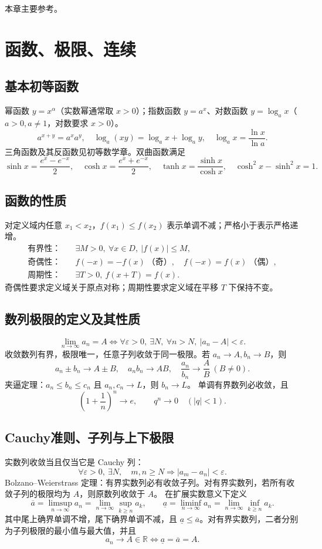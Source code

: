 \documentclass[../main.tex]{subfiles}
\begin{document}
本章主要参考\cite{dlmf,hunter}。

\section{函数、极限、连续}
\subsection{基本初等函数}
幂函数 $y=x^\alpha$（实数幂通常取 $x>0$）；指数函数 $y=a^x$、对数函数 $y=\log_a x$（$a>0,a\ne1$，对数要求 $x>0$）。
\[
a^{x+y}=a^xa^y,\quad \log_a(xy)=\log_a x+\log_a y,\quad
\log_a x=\frac{\ln x}{\ln a}.
\]
三角函数及其反函数见初等数学章。双曲函数满足
\[
\sinh x=\frac{e^x-e^{-x}}2,\quad \cosh x=\frac{e^x+e^{-x}}2,\quad
\tanh x=\frac{\sinh x}{\cosh x},\quad \cosh^2x-\sinh^2x=1.
\]
\subsection{函数的性质}
对定义域内任意 $x_1<x_2$，$f(x_1)\le f(x_2)$ 表示单调不减；严格小于表示严格递增。
\begin{align*}
\text{有界性：}&\quad \exists M>0,\ \forall x\in D,\ |f(x)|\le M,\\
\text{奇偶性：}&\quad f(-x)=-f(x)\ \text{（奇）},\quad f(-x)=f(x)\ \text{（偶）},\\
\text{周期性：}&\quad \exists T>0,\ f(x+T)=f(x).
\end{align*}
奇偶性要求定义域关于原点对称；周期性要求定义域在平移 $T$ 下保持不变。
\subsection{数列极限的定义及其性质}
\[
\lim_{n\to\infty}a_n=A\iff
\forall\varepsilon>0,\ \exists N,\ \forall n>N,\ |a_n-A|<\varepsilon.
\]
收敛数列有界，极限唯一，任意子列收敛于同一极限。若 $a_n\to A,b_n\to B$，则
\[
a_n\pm b_n\to A\pm B,\quad a_nb_n\to AB,\quad
\frac{a_n}{b_n}\to\frac AB\ (B\ne0).
\]
夹逼定理：$a_n\le b_n\le c_n$ 且 $a_n,c_n\to L$，则 $b_n\to L$。
单调有界数列必收敛，且
\[
\left(1+\frac1n\right)^n\to e,\qquad q^n\to0\quad(|q|<1).
\]
\subsection{Cauchy准则、子列与上下极限}
实数列收敛当且仅当它是 Cauchy 列：
\[
\forall\varepsilon>0,\ \exists N,\quad
m,n\ge N\Longrightarrow |a_m-a_n|<\varepsilon.
\]
Bolzano--Weierstrass 定理：有界实数列必有收敛子列。对有界实数列，若所有收敛子列的极限均为 $A$，则原数列收敛于 $A$。
在扩展实数意义下定义
\[
\overline a=\limsup_{n\to\infty}a_n
=\lim_{n\to\infty}\sup_{k\ge n}a_k,\qquad
\underline a=\liminf_{n\to\infty}a_n
=\lim_{n\to\infty}\inf_{k\ge n}a_k.
\]
其中尾上确界单调不增，尾下确界单调不减，且 $\underline a\le\overline a$。对有界实数列，二者分别为子列极限的最小值与最大值，并且
\[
a_n\to A\in\mathbb R\iff\underline a=\overline a=A.
\]
\end{document}
